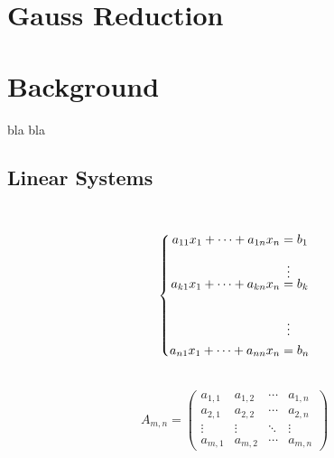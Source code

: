 \section{Gauss Reduction}
\section{Background}
bla bla
\subsection{Linear Systems}
\ \\
\[\left\{
\begin{aligned}
   a_{11}x_{1}+\dots +a_{1n}x_n &= b_1 \\\\
   &\shortvdotswithin{=}
   a_{k1}x_{1}+\dots +a_{kn}x_n &= b_k \\ \\
   &\vdotswithin{=} \notag \\
  a_{n1}x_{1}+\dots +a_{nn}x_n &= b_n \\
\end{aligned}
\right .\]

\ \\$$
A_{m,n} = 
 \begin{pmatrix}
  a_{1,1} & a_{1,2} & \cdots & a_{1,n} \\
  a_{2,1} & a_{2,2} & \cdots & a_{2,n} \\
  \vdots  & \vdots  & \ddots & \vdots  \\
  a_{m,1} & a_{m,2} & \cdots & a_{m,n} 
 \end{pmatrix}
 $$

